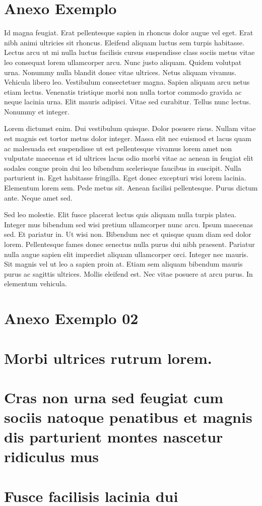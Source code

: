 \chapter{Anexo Exemplo}

Id magna feugiat. Erat pellentesque sapien in rhoncus dolor augue vel eget. Erat nibh animi ultricies sit rhoncus. Eleifend aliquam luctus sem turpis habitasse. Lectus arcu ut mi nulla luctus facilisis cursus suspendisse class sociis metus vitae leo consequat lorem ullamcorper arcu. Nunc justo aliquam. Quidem volutpat urna. Nonummy nulla blandit donec vitae ultrices. Netus aliquam vivamus. Vehicula libero leo. Vestibulum consectetuer magna. Sapien aliquam arcu netus etiam lectus. Venenatis tristique morbi non nulla tortor commodo gravida ac neque lacinia urna. Elit mauris adipisci. Vitae sed curabitur. Tellus nunc lectus. Nonummy et integer.

Lorem dictumst enim. Dui vestibulum quisque. Dolor posuere risus. Nullam vitae est magnis est tortor metus dolor integer. Massa elit nec euismod et lacus quam ac malesuada est suspendisse ut est pellentesque vivamus lorem amet non vulputate maecenas et id ultrices lacus odio morbi vitae ac aenean in feugiat elit sodales congue proin dui leo bibendum scelerisque faucibus in suscipit. Nulla parturient in. Eget habitasse fringilla. Eget donec excepturi wisi lorem lacinia. Elementum lorem sem. Pede metus sit. Aenean facilisi pellentesque. Purus dictum ante. Neque amet sed.

Sed leo molestie. Elit fusce placerat lectus quis aliquam nulla turpis platea. Integer mus bibendum sed wisi pretium ullamcorper nunc arcu. Ipsum maecenas sed. Et pariatur in. Ut wisi non. Bibendum nec et quisque quam diam sed dolor lorem. Pellentesque fames donec senectus nulla purus dui nibh praesent. Pariatur nulla augue sapien elit imperdiet aliquam ullamcorper orci. Integer nec mauris. Sit magnis vel ut leo a sapien proin at. Etiam sem aliquam bibendum mauris purus ac sagittis ultrices. Mollis eleifend est. Nec vitae posuere at arcu purus. In elementum vehicula.

\chapter{Anexo Exemplo 02}

\lipsum[1]


\chapter{Morbi ultrices rutrum lorem.}

\lipsum[30]


\chapter{Cras non urna sed feugiat cum sociis natoque penatibus et magnis dis parturient montes nascetur ridiculus mus}

\lipsum[31]

\chapter{Fusce facilisis lacinia dui}

\lipsum[32]